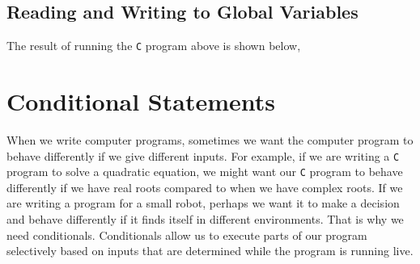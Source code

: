 \documentclass[a4paper, 12pt]{report}
\begin{document}
\begin{center}
\subsection{Reading and Writing to Global Variables}
\begin{comment}
\end{comment}

The result of running the \texttt{C} program above is shown below,


\section{Conditional Statements}
\begin{comment}
\end{comment}
When we write computer programs, sometimes we want the computer program to behave differently if we give different inputs. 
For example, if we are writing a \texttt{C} program to solve a quadratic equation, we might want our \texttt{C} program to behave differently if we have real roots compared to when we have complex roots.
If we are writing a program for a small robot, perhaps we want it to make a decision and behave differently if it finds itself in different environments.
That is why we need conditionals. Conditionals allow us to execute parts of our program selectively based on inputs that are determined while the program is running live.


\end{center}
\end{document}
